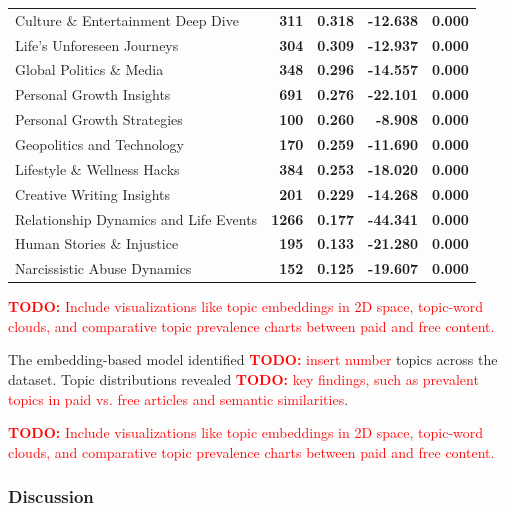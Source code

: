 \documentclass[11pt,a4paper]{article}
\newcommand{\todo}[1]{\textcolor{red}{\textbf{TODO:} #1}}
\begin{document}
\begin{table}[H]
\begin{tabular}{lrrrr}
        Culture \& Entertainment Deep Dive & \textbf{311} & \textbf{0.318} & \textbf{-12.638} & \textbf{0.000} \\
        Life's Unforeseen Journeys & \textbf{304} & \textbf{0.309} & \textbf{-12.937} & \textbf{0.000} \\
        Global Politics \& Media & \textbf{348} & \textbf{0.296} & \textbf{-14.557} & \textbf{0.000} \\
        Personal Growth Insights & \textbf{691} & \textbf{0.276} & \textbf{-22.101} & \textbf{0.000} \\
        Personal Growth Strategies & \textbf{100} & \textbf{0.260} & \textbf{-8.908} & \textbf{0.000} \\
        Geopolitics and Technology & \textbf{170} & \textbf{0.259} & \textbf{-11.690} & \textbf{0.000} \\
        Lifestyle \& Wellness Hacks & \textbf{384} & \textbf{0.253} & \textbf{-18.020} & \textbf{0.000} \\
        Creative Writing Insights & \textbf{201} & \textbf{0.229} & \textbf{-14.268} & \textbf{0.000} \\
        Relationship Dynamics and Life Events & \textbf{1266} & \textbf{0.177} & \textbf{-44.341} & \textbf{0.000} \\
        Human Stories \& Injustice & \textbf{195} & \textbf{0.133} & \textbf{-21.280} & \textbf{0.000} \\
        Narcissistic Abuse Dynamics & \textbf{152} & \textbf{0.125} & \textbf{-19.607} & \textbf{0.000} \\
        \bottomrule
    \end{tabular}
\end{table}

\todo{Include visualizations like topic embeddings in 2D space, topic-word clouds, and comparative topic prevalence charts between paid and free content.}

The embedding-based model identified \todo{insert number} topics across the dataset. Topic distributions revealed \todo{key findings, such as prevalent topics in paid vs. free articles and semantic similarities}.

\todo{Include visualizations like topic embeddings in 2D space, topic-word clouds, and comparative topic prevalence charts between paid and free content.}

\subsubsection{Discussion}
\end{document}
